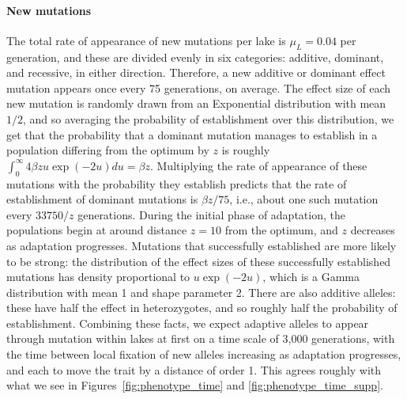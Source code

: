 \documentclass{article}
\begin{document}
\paragraph{New mutations}
The total rate of appearance of new mutations per lake is $\mu_L = 0.04$ per generation, 
and these are divided evenly in six categories: additive, dominant, and recessive, in either direction. 
Therefore, a new additive or dominant effect mutation appears once every 75 generations, on average. 
The effect size of each new mutation is randomly drawn from an Exponential distribution with mean $1/2$, 
and so averaging the probability of establishment over this distribution,
we get that the probability that a dominant mutation manages to establish in a population differing from the optimum by $z$ 
is roughly $\int_0^\infty 4 \beta z u \exp(-2u) du = \beta z$.
Multiplying the rate of appearance of these mutations with the probability they establish
predicts that the rate of establishment of dominant mutations is $\beta z / 75$, 
i.e., about one such mutation every $33750/z$ generations. 
During the initial phase of adaptation, the populations begin at around distance $z=10$ from the optimum,
and $z$ decreases as adaptation progresses.
Mutations that successfully established are more likely to be strong:
the distribution of the effect sizes of these successfully established mutations 
has density proportional to $u \exp(-2u)$,
which is a Gamma distribution with mean 1 and shape parameter 2. 
There are also additive alleles: these have half the effect in heterozygotes, 
and so roughly half the probability of establishment. 
Combining these facts,
we expect adaptive alleles to appear through mutation within lakes 
at first on a time scale of 3,000 generations, 
with the time between local fixation of new alleles increasing as adaptation progresses, 
and each to move the trait by a distance of order 1. 
This agrees roughly with what we see in Figures~\ref{fig:phenotype_time} 
and \ref{fig:phenotype_time_supp}.
\end{document}
